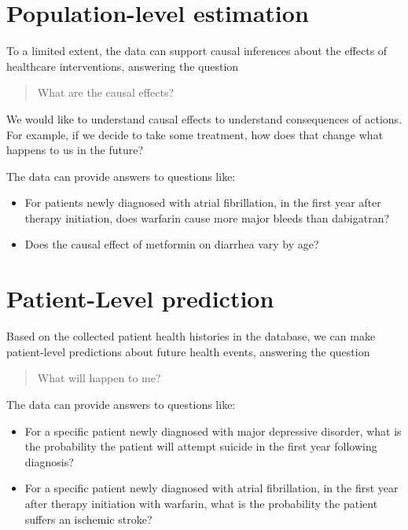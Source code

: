\documentclass[11pt]{book}
\providecommand{\tightlist}{%
  \setlength{\itemsep}{0pt}\setlength{\parskip}{0pt}}
\theoremstyle{definition}
\theoremstyle{definition}
\theoremstyle{definition}
\theoremstyle{remark}
\begin{document}
\hypertarget{population-level-estimation}{%
\section{Population-level estimation}\label{population-level-estimation}}

To a limited extent, the data can support causal inferences about the effects of healthcare interventions, answering the question

\begin{quote}
What are the causal effects?
\end{quote}

We would like to understand causal effects to understand consequences of actions. For example, if we decide to take some treatment, how does that change what happens to us in the future?

The data can provide answers to questions like:

\begin{itemize}
\tightlist
\item
  For patients newly diagnosed with atrial fibrillation, in the first year after therapy initiation, does warfarin cause more major bleeds than dabigatran?
\item
  Does the causal effect of metformin on diarrhea vary by age?
\end{itemize}

\hypertarget{patient-level-prediction}{%
\section{Patient-Level prediction}\label{patient-level-prediction}}

Based on the collected patient health histories in the database, we can make patient-level predictions about future health events, answering the question

\begin{quote}
What will happen to me?
\end{quote}

The data can provide answers to questions like:

\begin{itemize}
\tightlist
\item
  For a specific patient newly diagnosed with major depressive disorder, what is the probability the patient will attempt suicide in the first year following diagnosis?
\item
  For a specific patient newly diagnosed with atrial fibrillation, in the first year after therapy initiation with warfarin, what is the probability the patient suffers an ischemic stroke?
\end{itemize}
\end{document}
